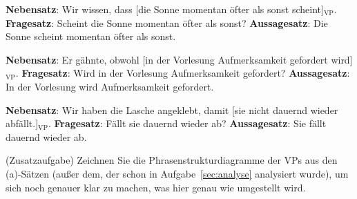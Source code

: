 \documentclass[12pt,a4paper,twoside]{article}
\newcommand{\blau}[1]{\textcolor{blau}{#1}}
\newcommand{\grau}[1]{\textcolor{grau}{#1}}
\newcommand{\Sub}[1]{\ensuremath{_{\text{#1}}}}
\newcommand{\Zeile}{\vspace{\baselineskip}}
\begin{document}
\begin{exe}
\setcounter{xnumi}{0}
  \ex
  \begin{xlist}
    \ex \textbf{Nebensatz}: \grau{Wir wissen, dass} \blau{[die Sonne momentan öfter als sonst scheint]\Sub{VP}}\grau{.}
    \ex \textbf{Fragesatz}: \blau{Scheint die Sonne momentan öfter als sonst?}
    \ex \textbf{Aussagesatz}: \blau{Die Sonne scheint momentan öfter als sonst.}
  \end{xlist}
  \Zeile
  \ex
  \begin{xlist}
    \ex \textbf{Nebensatz}: \grau{Er gähnte, obwohl} \blau{[in der Vorlesung Aufmerksamkeit gefordert wird]\Sub{VP}}\grau{.}
    \ex \textbf{Fragesatz}: \blau{Wird in der Vorlesung Aufmerksamkeit gefordert?}
    \ex \textbf{Aussagesatz}: \blau{In der Vorlesung wird Aufmerksamkeit gefordert.}
  \end{xlist}
  \Zeile
  \ex
  \begin{xlist}
    \ex \textbf{Nebensatz}: \grau{Wir haben die Lasche angeklebt, damit} \blau{[sie nicht dauernd wieder abfällt.]\Sub{VP}}\grau{.}
    \ex \textbf{Fragesatz}: \blau{Fällt sie dauernd wieder ab?}
    \ex \textbf{Aussagesatz}: \blau{Sie fällt dauernd wieder ab.}
  \end{xlist}
\end{exe}

(Zusatzaufgabe) Zeichnen Sie die Phrasenstrukturdiagramme der VPs aus den (a)-Sätzen (außer dem, der schon in Aufgabe~\ref{sec:analyse} analysiert wurde), um sich noch genauer klar zu machen, was hier genau wie umgestellt wird.
\end{document}
